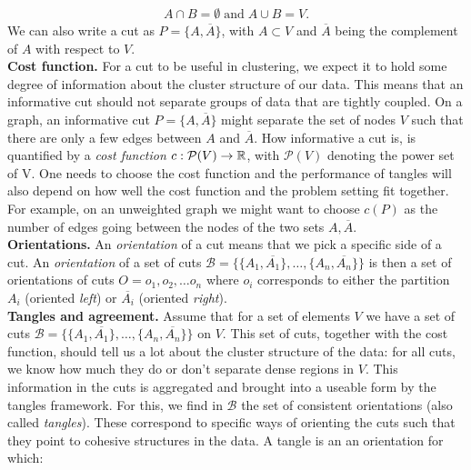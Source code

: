 \begin{align*}
A \cap B = \emptyset\;\text{and}\;A \cup B = V.
\end{align*}
We can also write a cut as $P = \{A, \overline{A}\}$, with $A \subset V$ and $\overline{A}$ being the
complement of $A$ with respect to $V$. \\

\noindent
\textbf{Cost function.} For a cut to be useful in clustering, we expect it to hold some degree of information about the cluster 
structure of our data. This means that an informative cut should not separate groups of data that are tightly coupled.
On a graph, an informative cut $P = \{A, \overline{A}\}$ might separate the set of nodes $V$ such that there 
are only a few edges between $A$ and $\overline{A}$. How informative a cut is, is quantified by a \textit{cost function} $c: \mathcal{P}(V) \to \mathbb{R}$, 
with $\mathcal{P}(V)$ denoting the power set of V. 
One needs to choose the cost function and the performance of tangles will also depend on how well the cost function and the problem setting fit together. 
For example, on an unweighted graph we might want to choose $c(P)$ as the number of edges
going between the nodes of the two sets $A, \overline{A}$. \\

\noindent
\textbf{Orientations.}
An \textit{orientation} of a cut means that we pick a specific side of a cut. 
An \textit{orientation} of a set of cuts 
$\mathcal{B} = \{\{A_1, \overline{A_1}\}, \ldots, \{A_n, \overline{A_n}\} \}$ is  
then a set of orientations of cuts $O = {o_1, o_2, \ldots o_n}$
where $o_i$ corresponds to either the partition $A_i$ 
(oriented \textit{left}) or $\overline{A_i}$ (oriented \textit{right}). \\ 

\noindent
\textbf{Tangles and agreement.} Assume that for a set of elements $V$ we have a set of cuts $\mathcal{B} = \{\{A_1, \overline{A_1}\}, \ldots, \{A_n, \overline{A_n}\} \} $ on $V$.
This set of cuts, together with the cost function, should tell us a lot about the cluster structure of the data:
for all cuts, we know how much they do or don't separate dense regions in $V$. 
This information in the cuts is aggregated and brought into a useable form by the tangles framework. 
For this, we find in $\mathcal{B}$ the set of consistent orientations (also called \textit{tangles}).  
These correspond to specific ways of orienting the cuts such that they point to cohesive structures in the data.  
A tangle is an an orientation for which:

